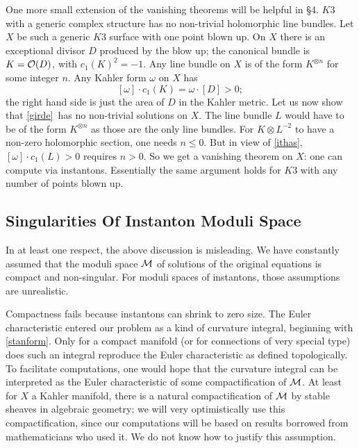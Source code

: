\documentclass[12pt]{article}
\numberwithin{equation}{section}
\begin{document}
One more small extension of the vanishing theorems will be helpful
in \S4.
$K3$ with a generic complex structure
has no non-trivial holomorphic line bundles.
Let $X$ be such a generic $K3$ surface with one point blown up.
On $X$ there is an exceptional divisor $D$ produced by the blow up;
the canonical bundle is $K={\cal O}(D)$, with $c_1(K)^2=-1$.
Any line bundle on $X$ is of the form $K^{\otimes n}$ for some integer
$n$.  Any Kahler form $\omega $ on $X$
has
\begin{equation}
  \label{ithas}
  [\omega]\cdot c_1(K)=\omega\cdot [D]>0;
\end{equation}
the right hand side is just the area of $D$ in the Kahler metric.
Let us now show that \eqref{girde}\ has no non-trivial solutions on $X$.
The line bundle $L$ would have to be of the form $K^{\otimes n}$
as those are the only line bundles.  For $K\otimes L^{-2}$ to have
a non-zero holomorphic section, one needs $n\leq 0$.
But in view of \eqref{ithas}, $[\omega]\cdot c_1(L)>0$ requires
$n>0$.  So we get a vanishing theorem on $X$: one can compute
via instantons.  Essentially the same argument holds for $K3$ with any
number of points blown up.

\subsection{Singularities Of Instanton Moduli Space}

In at least one respect, the above discussion is misleading.
We have constantly assumed that the moduli space ${\cal M}$
of solutions of the original equations is compact and non-singular.
For moduli spaces of instantons, those assumptions are unrealistic.

Compactness fails because instantons can shrink to zero size.
The Euler characteristic entered our problem as a kind of curvature
integral, beginning with \eqref{stanform}.  Only for a compact manifold
(or for connections of very special type)
does such an integral reproduce the Euler characteristic as defined
topologically.  To facilitate computations, one would hope that
the curvature integral can be interpreted as the Euler characteristic
of some compactification of ${\cal M}$.  At least for $X$ a Kahler
manifold, there is a natural compactification of ${\cal M}$ by
stable sheaves in algebraic geometry; we will very optimistically
use this compactification, since our computations will be based on
results borrowed from mathematicians who used it.  We do not
know how to justify this assumption.
\end{document}

